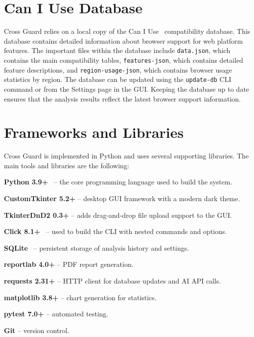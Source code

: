 \section{Can I Use Database}
\label{sec:caniuse-db}

Cross Guard relies on a local copy of the Can I Use~\cite{caniuse} compatibility database. This database contains detailed information about browser support for web platform features. The important files within the database include \texttt{data.json}, which contains the main compatibility tables, \texttt{features-json}, which contains detailed feature descriptions, and \texttt{region-usage-json}, which contains browser usage statistics by region. The database can be updated using the \texttt{update-db} CLI command or from the Settings page in the GUI. Keeping the database up to date ensures that the analysis results reflect the latest browser support information.

\section{Frameworks and Libraries}
\label{sec:frameworks}

Cross Guard is implemented in Python and uses several supporting libraries. The main tools and libraries are the following:

\begin{compactitem}
    \item \textbf{Python 3.9+}~\cite{python39} -- the core programming language used to build the system.
    \item \textbf{CustomTkinter 5.2+} -- desktop GUI framework with a modern dark theme.
    \item \textbf{TkinterDnD2 0.3+} -- adds drag-and-drop file upload support to the GUI.
    \item \textbf{Click 8.1+}~\cite{clickdocs} -- used to build the CLI with nested commands and options.
    \item \textbf{SQLite}~\cite{sqlitedocs} -- persistent storage of analysis history and settings.
    \item \textbf{reportlab 4.0+} -- PDF report generation.
    \item \textbf{requests 2.31+} -- HTTP client for database updates and AI API calls.
    \item \textbf{matplotlib 3.8+} -- chart generation for statistics.
    \item \textbf{pytest 7.0+} -- automated testing.
    \item \textbf{Git} -- version control.
\end{compactitem}
\newpage
